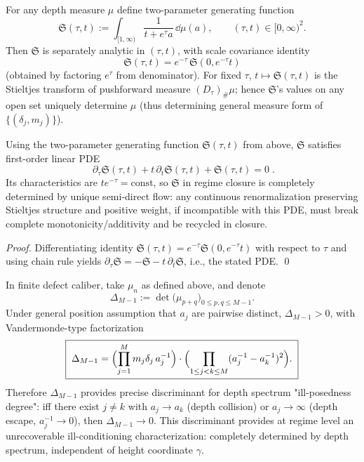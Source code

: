 \begin{proposition}
For any depth measure \(\mu\) define two-parameter generating function
\[
\mathfrak{S}(\tau,t):=\int_{[1,\infty)}\frac{1}{t+e^\tau a}\,\dd\mu(a),
\qquad (\tau,t)\in[0,\infty)^2.
\]
Then \(\mathfrak{S}\) is separately analytic in \((\tau,t)\), with scale covariance identity
\[
\boxed{\;
\mathfrak{S}(\tau,t)=e^{-\tau}\,\mathfrak{S}\!\left(0,e^{-\tau}t\right)\;}
\]
(obtained by factoring \(e^\tau\) from denominator).
For fixed \(\tau\), \(t\mapsto\mathfrak{S}(\tau,t)\) is the Stieltjes transform of pushforward measure \((D_\tau)_\#\mu\); hence \(\mathfrak{S}\)'s values on any open set uniquely determine \(\mu\) (thus determining general measure form of \(\{(\delta_j,m_j)\}\)).
\end{proposition}

\begin{proposition}\label{prop:xi-stieltjes-semidir-pde}
Using the two-parameter generating function \(\mathfrak{S}(\tau,t)\) from above, \(\mathfrak{S}\) satisfies first-order linear PDE
\[
\boxed{\;
\partial_\tau \mathfrak{S}(\tau,t)+t\,\partial_t \mathfrak{S}(\tau,t)+\mathfrak{S}(\tau,t)=0\; }.
\]
Its characteristics are \(t e^{-\tau}=\mathrm{const}\), so \(\mathfrak{S}\) in regime closure is completely determined by unique semi-direct flow: any continuous renormalization preserving Stieltjes structure and positive weight, if incompatible with this PDE, must break complete monotonicity/additivity and be recycled in closure.
\end{proposition}
\begin{proof}
Differentiating identity \(\mathfrak{S}(\tau,t)=e^{-\tau}\mathfrak{S}(0,e^{-\tau}t)\) with respect to \(\tau\) and using chain rule yields
\(
\partial_\tau \mathfrak{S}=-\mathfrak{S}-t\,\partial_t \mathfrak{S}
\), i.e., the stated PDE. \qed
\end{proof}

\begin{proposition}
In finite defect caliber, take \(\mu_n\) as defined above, and denote
\[
\Delta_{M-1}:=\det\bigl(\mu_{p+q}\bigr)_{0\le p,q\le M-1}.
\]
Under general position assumption that \(a_j\) are pairwise distinct, \(\Delta_{M-1}>0\), with Vandermonde-type factorization
\[
\boxed{\;
\Delta_{M-1}
=\Bigl(\prod_{j=1}^{M}m_j\delta_j\,a_j^{-1}\Bigr)\cdot
\Bigl(\prod_{1\le j<k\le M}(a_j^{-1}-a_k^{-1})^2\Bigr).\;}
\]
Therefore \(\Delta_{M-1}\) provides precise discriminant for depth spectrum "ill-posedness degree": iff there exist \(j\neq k\) with \(a_j\to a_k\) (depth collision) or \(a_j\to\infty\) (depth escape, \(a_j^{-1}\to 0\)), then \(\Delta_{M-1}\to0\).
This discriminant provides at regime level an unrecoverable ill-conditioning characterization: completely determined by depth spectrum, independent of height coordinate \(\gamma\).
\end{proposition}

